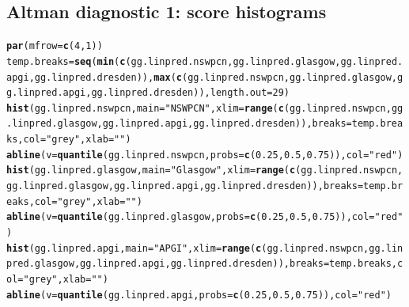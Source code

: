 \documentclass{article}\usepackage[]{graphicx}\usepackage[]{color}
\makeatletter
\newcommand{\hlnum}[1]{\textcolor[rgb]{0.686,0.059,0.569}{#1}}%
\newcommand{\hlstr}[1]{\textcolor[rgb]{0.192,0.494,0.8}{#1}}%
\newcommand{\hlstd}[1]{\textcolor[rgb]{0.345,0.345,0.345}{#1}}%
\newcommand{\hlkwb}[1]{\textcolor[rgb]{0.69,0.353,0.396}{#1}}%
\newcommand{\hlkwc}[1]{\textcolor[rgb]{0.333,0.667,0.333}{#1}}%
\newcommand{\hlkwd}[1]{\textcolor[rgb]{0.737,0.353,0.396}{\textbf{#1}}}%
\newenvironment{kframe}{%
 \def\at@end@of@kframe{}%
 \ifinner\ifhmode%
  \def\at@end@of@kframe{\end{minipage}}%
  \begin{minipage}{\columnwidth}%
 \fi\fi%
 \def\FrameCommand##1{\hskip\@totalleftmargin \hskip-\fboxsep
 \colorbox{shadecolor}{##1}\hskip-\fboxsep
     \hskip-\linewidth \hskip-\@totalleftmargin \hskip\columnwidth}%
 \MakeFramed {\advance\hsize-\width
   \@totalleftmargin\z@ \linewidth\hsize
   \@setminipage}}%
 {\par\unskip\endMakeFramed%
 \at@end@of@kframe}
\newenvironment{knitrout}{}{} %
\makeatother
\begin{document}
\subsection{Altman diagnostic 1: score histograms}
\begin{knitrout}
\color{fgcolor}\begin{kframe}
\begin{alltt}
\hlkwd{par}\hlstd{(}\hlkwc{mfrow} \hlstd{=} \hlkwd{c}\hlstd{(}\hlnum{4}\hlstd{,} \hlnum{1}\hlstd{))}
\hlstd{temp.breaks} \hlkwb{=} \hlkwd{seq}\hlstd{(}\hlkwd{min}\hlstd{(}\hlkwd{c}\hlstd{(gg.linpred.nswpcn, gg.linpred.glasgow, gg.linpred.apgi, gg.linpred.dresden)),} \hlkwd{max}\hlstd{(}\hlkwd{c}\hlstd{(gg.linpred.nswpcn, gg.linpred.glasgow, gg.linpred.apgi, gg.linpred.dresden)),} \hlkwc{length.out} \hlstd{=} \hlnum{29}\hlstd{)}
\hlkwd{hist}\hlstd{(gg.linpred.nswpcn,} \hlkwc{main} \hlstd{=} \hlstr{"NSWPCN"}\hlstd{,} \hlkwc{xlim} \hlstd{=} \hlkwd{range}\hlstd{(}\hlkwd{c}\hlstd{(gg.linpred.nswpcn, gg.linpred.glasgow, gg.linpred.apgi, gg.linpred.dresden)),} \hlkwc{breaks} \hlstd{= temp.breaks,} \hlkwc{col} \hlstd{=} \hlstr{"grey"}\hlstd{,} \hlkwc{xlab} \hlstd{=} \hlstr{""}\hlstd{)}
\hlkwd{abline}\hlstd{(}\hlkwc{v} \hlstd{=} \hlkwd{quantile}\hlstd{(gg.linpred.nswpcn,} \hlkwc{probs} \hlstd{=} \hlkwd{c}\hlstd{(}\hlnum{0.25}\hlstd{,} \hlnum{0.5}\hlstd{,} \hlnum{0.75}\hlstd{)),} \hlkwc{col} \hlstd{=} \hlstr{"red"}\hlstd{)}
\hlkwd{hist}\hlstd{(gg.linpred.glasgow,} \hlkwc{main} \hlstd{=} \hlstr{"Glasgow"}\hlstd{,} \hlkwc{xlim} \hlstd{=} \hlkwd{range}\hlstd{(}\hlkwd{c}\hlstd{(gg.linpred.nswpcn, gg.linpred.glasgow, gg.linpred.apgi, gg.linpred.dresden)),} \hlkwc{breaks} \hlstd{= temp.breaks,} \hlkwc{col} \hlstd{=} \hlstr{"grey"}\hlstd{,} \hlkwc{xlab} \hlstd{=} \hlstr{""}\hlstd{)}
\hlkwd{abline}\hlstd{(}\hlkwc{v} \hlstd{=} \hlkwd{quantile}\hlstd{(gg.linpred.glasgow,} \hlkwc{probs} \hlstd{=} \hlkwd{c}\hlstd{(}\hlnum{0.25}\hlstd{,} \hlnum{0.5}\hlstd{,} \hlnum{0.75}\hlstd{)),} \hlkwc{col} \hlstd{=} \hlstr{"red"}\hlstd{)}
\hlkwd{hist}\hlstd{(gg.linpred.apgi,} \hlkwc{main} \hlstd{=} \hlstr{"APGI"}\hlstd{,} \hlkwc{xlim} \hlstd{=} \hlkwd{range}\hlstd{(}\hlkwd{c}\hlstd{(gg.linpred.nswpcn, gg.linpred.glasgow, gg.linpred.apgi, gg.linpred.dresden)),} \hlkwc{breaks} \hlstd{= temp.breaks,} \hlkwc{col} \hlstd{=} \hlstr{"grey"}\hlstd{,} \hlkwc{xlab} \hlstd{=} \hlstr{""}\hlstd{)}
\hlkwd{abline}\hlstd{(}\hlkwc{v} \hlstd{=} \hlkwd{quantile}\hlstd{(gg.linpred.apgi,} \hlkwc{probs} \hlstd{=} \hlkwd{c}\hlstd{(}\hlnum{0.25}\hlstd{,} \hlnum{0.5}\hlstd{,} \hlnum{0.75}\hlstd{)),} \hlkwc{col} \hlstd{=} \hlstr{"red"}\hlstd{)}

\end{alltt}
\end{kframe}
\end{knitrout}
\end{document}
